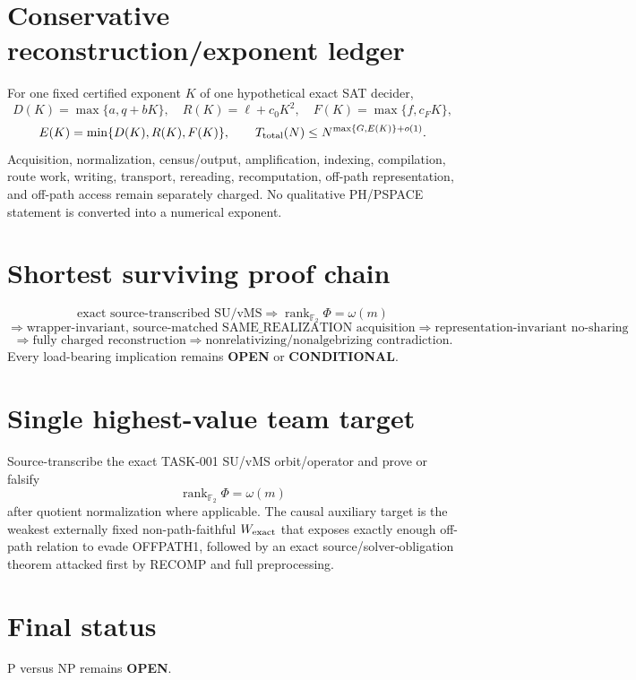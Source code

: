 \documentclass[11pt]{article}
\begin{document}
\section*{Conservative reconstruction/exponent ledger}
For one fixed certified exponent \(K\) of one hypothetical exact SAT decider,
\[
D(K)=\max\{a,q+bK\},\quad
R(K)=\ell+c_0K^2,\quad
F(K)=\max\{f,c_FK\},
\]
\[
E(K)=\min\{D(K),R(K),F(K)\},
\qquad
T_{\rm total}(N)\le N^{\max\{G,E(K)\}+o(1)}.
\]
Acquisition, normalization, census/output, amplification, indexing, compilation, route work, writing, transport, rereading, recomputation, off-path representation, and off-path access remain separately charged. No qualitative PH/PSPACE statement is converted into a numerical exponent.

\section*{Shortest surviving proof chain}
\[
\text{exact source-transcribed SU/vMS}
\Longrightarrow
\operatorname{rank}_{\mathbb F_2}\Phi=\omega(m)
\]
\[
\Longrightarrow
\boxed{\text{wrapper-invariant, source-matched SAME\_REALIZATION acquisition}}
\Longrightarrow
\text{representation-invariant no-sharing}
\]
\[
\Longrightarrow
\text{fully charged reconstruction}
\Longrightarrow
\text{nonrelativizing/nonalgebrizing contradiction}.
\]
Every load-bearing implication remains \textbf{OPEN} or \textbf{CONDITIONAL}.

\section*{Single highest-value team target}
Source-transcribe the exact TASK-001 SU/vMS orbit/operator and prove or falsify
\[
\boxed{\operatorname{rank}_{\mathbb F_2}\Phi=\omega(m)}
\]
after quotient normalization where applicable. The causal auxiliary target is the weakest externally fixed non-path-faithful \(W_{\rm exact}\) that exposes exactly enough off-path relation to evade OFFPATH1, followed by an exact source/solver-obligation theorem attacked first by RECOMP and full preprocessing.

\section*{Final status}
P versus NP remains \textbf{OPEN}.

\end{document}
